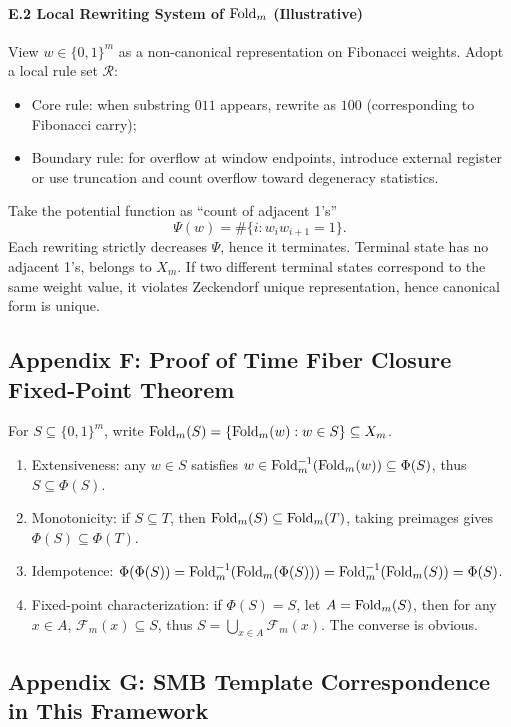 \paragraph{E.2 Local Rewriting System of $\mathrm{Fold}_m$ (Illustrative)}
View $w\in\{0,1\}^m$ as a non-canonical representation on Fibonacci weights. Adopt a local rule set $\mathcal{R}$:
\begin{itemize}
  \item Core rule: when substring $011$ appears, rewrite as $100$ (corresponding to Fibonacci carry);
  \item Boundary rule: for overflow at window endpoints, introduce external register or use truncation and count overflow toward degeneracy statistics.
\end{itemize}
Take the potential function as ``count of adjacent 1's''
\[
\Psi(w)=\#\{i: w_iw_{i+1}=1\}.
\]
Each rewriting strictly decreases $\Psi$, hence it terminates. Terminal state has no adjacent 1's, belongs to $X_m$. If two different terminal states correspond to the same weight value, it violates Zeckendorf unique representation, hence canonical form is unique.

\subsection{Appendix F: Proof of Time Fiber Closure Fixed-Point Theorem}
\label{app:closure-proof}

For $S\subseteq\{0,1\}^m$, write $\mathrm{Fold}_m(S)=\{\mathrm{Fold}_m(w):w\in S\}\subseteq X_m$.
\begin{enumerate}
  \item Extensiveness: any $w\in S$ satisfies $w\in \mathrm{Fold}_m^{-1}(\mathrm{Fold}_m(w))\subseteq \Phi(S)$, thus $S\subseteq\Phi(S)$.
  \item Monotonicity: if $S\subseteq T$, then $\mathrm{Fold}_m(S)\subseteq\mathrm{Fold}_m(T)$, taking preimages gives $\Phi(S)\subseteq\Phi(T)$.
  \item Idempotence: $\Phi(\Phi(S))=\mathrm{Fold}_m^{-1}(\mathrm{Fold}_m(\Phi(S)))=\mathrm{Fold}_m^{-1}(\mathrm{Fold}_m(S))=\Phi(S)$.
  \item Fixed-point characterization: if $\Phi(S)=S$, let $A=\mathrm{Fold}_m(S)$, then for any $x\in A$, $\mathcal{F}_m(x)\subseteq S$, thus $S=\bigcup_{x\in A}\mathcal{F}_m(x)$. The converse is obvious.
\end{enumerate}

\subsection{Appendix G: SMB Template Correspondence in This Framework}
\label{app:smb}

